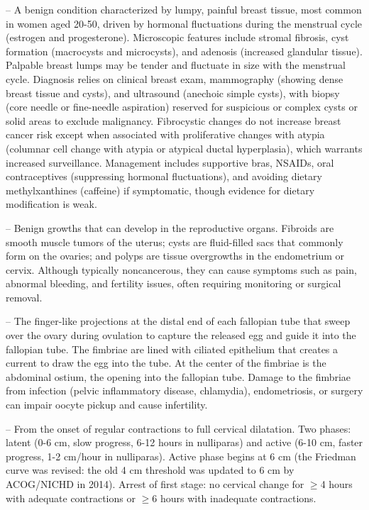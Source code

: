 -- A benign condition characterized by lumpy, painful breast tissue, most common in women aged 20-50, driven by hormonal fluctuations during the menstrual cycle (estrogen and progesterone). Microscopic features include stromal fibrosis, cyst formation (macrocysts and microcysts), and adenosis (increased glandular tissue). Palpable breast lumps may be tender and fluctuate in size with the menstrual cycle. Diagnosis relies on clinical breast exam, mammography (showing dense breast tissue and cysts), and ultrasound (anechoic simple cysts), with biopsy (core needle or fine-needle aspiration) reserved for suspicious or complex cysts or solid areas to exclude malignancy. Fibrocystic changes do not increase breast cancer risk except when associated with proliferative changes with atypia (columnar cell change with atypia or atypical ductal hyperplasia), which warrants increased surveillance. Management includes supportive bras, NSAIDs, oral contraceptives (suppressing hormonal fluctuations), and avoiding dietary methylxanthines (caffeine) if symptomatic, though evidence for dietary modification is weak.

-- Benign growths that can develop in the reproductive organs. Fibroids are smooth muscle tumors of the uterus; cysts are fluid-filled sacs that commonly form on the ovaries; and polyps are tissue overgrowths in the endometrium or cervix. Although typically noncancerous, they can cause symptoms such as pain, abnormal bleeding, and fertility issues, often requiring monitoring or surgical removal.

-- The finger-like projections at the distal end of each fallopian tube that sweep over the ovary during ovulation to capture the released egg and guide it into the fallopian tube. The fimbriae are lined with ciliated epithelium that creates a current to draw the egg into the tube. At the center of the fimbriae is the abdominal ostium, the opening into the fallopian tube. Damage to the fimbriae from infection (pelvic inflammatory disease, chlamydia), endometriosis, or surgery can impair oocyte pickup and cause infertility.

-- From the onset of regular contractions to full cervical dilatation. Two phases: latent (0-6 cm, slow progress, 6-12 hours in nulliparas) and active (6-10 cm, faster progress, 1-2 cm/hour in nulliparas). Active phase begins at 6 cm (the Friedman curve was revised: the old 4 cm threshold was updated to 6 cm by ACOG/NICHD in 2014). Arrest of first stage: no cervical change for \(\ge\)4 hours with adequate contractions or \(\ge\)6 hours with inadequate contractions.

